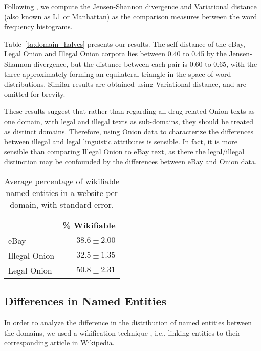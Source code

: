 \documentclass[11pt,a4paper,table]{article}
\newcommand{\oa}[1]{\footnote{\color{red}OA: #1}}
\begin{document}
    Following \citet{Plank2011EffectiveMO}, we compute the Jensen-Shannon divergence and Variational distance (also known as L1 or Manhattan) as the comparison measures between the word frequency histograms.
    
    Table~\ref{ta:domain_halves} presents our results.
    The self-distance of the eBay, Legal Onion and Illegal Onion corpora lies between 0.40 to 0.45
    by the Jensen-Shannon divergence, but the distance between each pair is 0.60 to 0.65, with the three approximately forming an equilateral triangle
    in the space of word distributions.
    Similar results are obtained using Variational distance, and are omitted for brevity.

    These results suggest that rather than regarding all drug-related Onion texts as one domain, with legal and illegal texts as sub-domains, 
      they should be treated as distinct domains.
    Therefore, using Onion data to characterize the differences between illegal and legal linguistic attributes is sensible. 
    In fact, it is more sensible than comparing Illegal Onion to eBay text, as there the legal/illegal distinction may be confounded by the differences
      between eBay and Onion data.

\begin{table}
\begin{center}
\begin{tabular}{l|r}
 & \% Wikifiable\\
 \hline
eBay & $38.6 \pm2.00$\\
Illegal Onion & $32.5 \pm1.35$\\
Legal Onion & $50.8 \pm2.31$
\end{tabular}
\end{center}
\caption{Average percentage of wikifiable named entities in a website per domain, with standard error.\label{ta:wiki}}
\end{table}


\subsection{Differences in Named Entities}

    In order to analyze the difference in the distribution of 
    named entities between the domains,  we used a wikification technique \cite{bunescu2006using}, i.e., linking entities to their corresponding article in Wikipedia.
\end{document}
